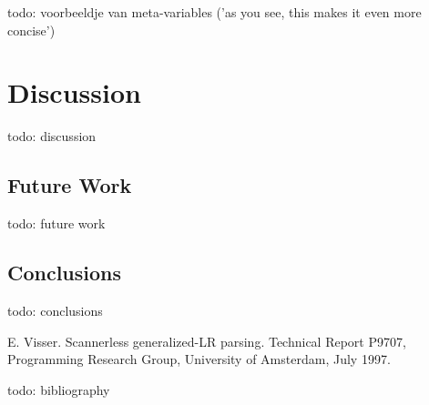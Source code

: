 \documentclass[a4paper,11pt]{article}
\begin{document}
todo: voorbeeldje van meta-variables ('as you see, this makes it even more concise')


\section{Discussion}

todo: discussion


\subsection{Future Work}

todo: future work


\subsection{Conclusions}

todo: conclusions


\begin{thebibliography}{99}

E. Visser. Scannerless generalized-LR parsing.
Technical Report P9707, Programming Research Group, University of Amsterdam, July 1997.

todo: bibliography

\end{thebibliography}
\end{document}
